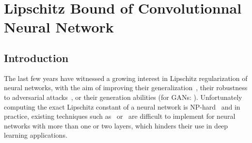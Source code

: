 
\chapter{Lipschitz Bound of Convolutionnal Neural Network}
\label{chapter:lipschitz_bound}
\localtableofcontents



\section{Introduction}
\label{section:ch4-introduction}


The last few years have witnessed a growing interest in Lipschitz regularization of neural networks, with the aim of improving their generalization~\cite{bartlett2017spectrally}, their robustness to adversarial attacks~\cite{tsuzuku2018lipschitz, farnia2018generalizable}, or their generation abilities (\eg for GANs: \cite{miyato2018spectral,arjovsky2017wasserstein}).
Unfortunately computing  the exact Lipschitz constant of a neural network is NP-hard~\cite{scaman2018lipschitz} and in practice, existing techniques such as~\cite{scaman2018lipschitz, NIPS2019_9319} or~\cite{latorre2020lipschitz} are difficult to implement for neural networks with more than one or two layers, which hinders their use in deep learning applications.


